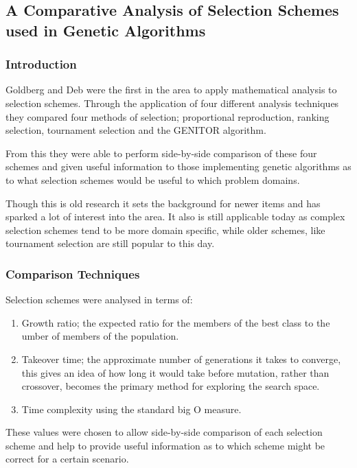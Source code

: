 \documentclass[10pt, a4paper]{article}
\begin{document}
\subsection{A Comparative Analysis of Selection Schemes used in Genetic Algorithms}
\subsubsection{Introduction}

Goldberg and Deb\cite{Goldberg1991Comparative} were the first in the area to
apply mathematical analysis to selection schemes. Through the application of
four different analysis techniques they compared four methods of  selection; 
proportional reproduction, ranking selection, tournament selection and the 
GENITOR algorithm\cite{Whitley1989GENITOR}.

From this they were able to perform side-by-side comparison of these four
schemes and given useful information to those implementing genetic algorithms as
to what selection schemes would be useful to which problem domains.

Though this is old research it sets the background for newer items and has
sparked a lot of interest into the area. It also is still applicable today as
complex selection schemes tend to be more domain specific, while older schemes,
like tournament selection are still popular to this day.

\subsubsection{Comparison Techniques} 
Selection schemes were analysed in terms of:

\begin{enumerate}
\item Growth ratio; the expected ratio for the members of the best class to the
umber of members of the population.
\item Takeover time; the approximate number of generations it takes
to converge, this gives an idea of how long it would take before mutation,
rather than crossover, becomes the primary method for exploring the search
space. 
\item Time complexity using the standard big O measure.
\end{enumerate}

These values were chosen to allow side-by-side comparison of each selection
scheme and help to provide useful information as to which scheme might be
correct for a certain scenario.
\end{document}
